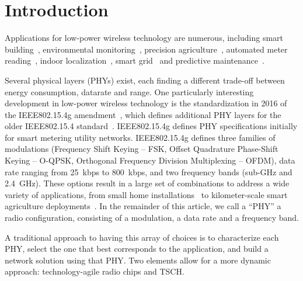 \documentclass[sensors,article,submit,moreauthors,pdftex]{Definitions/mdpi}
\begin{document}
\section{Introduction}
\label{sec:introduction}


Applications for low-power wireless technology are numerous, including
    smart building~\cite{munoz18overview,kazmi14review},
    environmental monitoring~\cite{munoz18evaluation},
    precision agriculture~\cite{watteyne16peach},
    automated meter reading~\cite{sum17experimental},
    indoor localization~\cite{tanaka20blink},
    smart grid~\cite{fadel15survey} and
    predictive maintenance~\cite{civerchia17industrial}.


Several physical layers (PHYs) exist, each finding a different trade-off between
    energy consumption,
    datarate and
    range.
One particularly interesting development in low-power wireless technology is the standardization in 2016 of the IEEE802.15.4g amendment~\cite{std_ieee802154g}, which defines additional PHY layers for the older IEEE802.15.4 standard~\cite{std_ieee802154}.
IEEE802.15.4g defines PHY specifications initially for smart metering utility networks.
IEEE802.15.4g defines
    three families of modulations (Frequency Shift Keying -- FSK,  Offset Quadrature Phase-Shift Keying -- O-QPSK, Orthogonal Frequency Division Multiplexing -- OFDM),
    data rate ranging from 25~kbps to 800~kbps, and
    two frequency bands (sub-GHz and 2.4~GHz).
These options result in a large set of combinations to address a wide variety of applications, from
    small home installations~\cite{tuset19experimental} to
    kilometer-scale smart agriculture deployments~\cite{munoz19km}.
In the remainder of this article, we call a ``PHY'' a radio configuration, consisting of
    a modulation,
    a data rate and
    a frequency band.


A traditional approach to having this array of choices is to
    characterize each PHY,
    select the one that best corresponds to the application, and
    build a network solution using that PHY.
Two elements allow for a more dynamic approach:
    technology-agile radio chips and
    TSCH.

\end{document}
